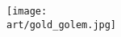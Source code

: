 \begin{multicols*}{2}
\columnbreak

\hspace{-2.5em}
\texttt{[image: \\art/gold\_golem.jpg]}

\end{multicols*}
